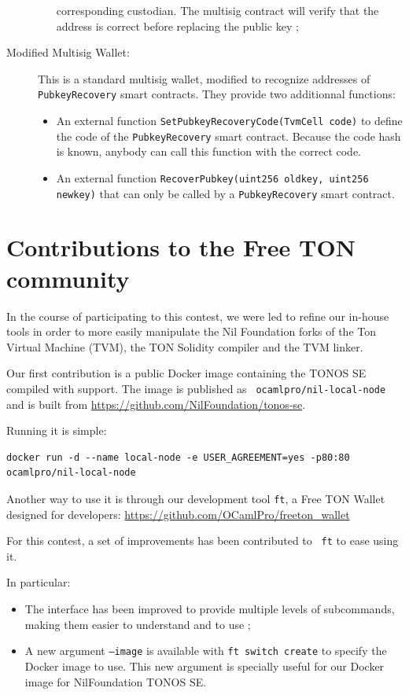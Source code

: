 \documentclass[10pt,a4paper]{article}
\begin{document}
\begin{description}
\begin{itemize}
    corresponding custodian. The multisig contract will verify that
    the address is correct before replacing the public key ;
  \end{itemize}
\item[Modified Multisig Wallet:] This is a standard multisig wallet,
  modified to recognize addresses of \lstinline{PubkeyRecovery} smart
  contracts. They provide two additionnal functions:
  \begin{itemize}
  \item An external function
    \lstinline{SetPubkeyRecoveryCode(TvmCell code)}
    to define the code of the \lstinline{PubkeyRecovery} smart
    contract. Because the code hash is known, anybody can call this
    function with the correct code.
  \item An external function
    \lstinline{RecoverPubkey(uint256 oldkey, uint256 newkey)}
    that can only be called by a
    \lstinline{PubkeyRecovery} smart contract.
  \end{itemize}
\end{description}


\section{Contributions to the Free TON community}
\label{sec:contributions}

In the course of participating to this contest, we were led to refine
our in-house tools in order to more easily manipulate the Nil
Foundation forks of the Ton Virtual Machine (TVM), the TON Solidity
compiler and the TVM linker.

Our first contribution is a public Docker image containing the TONOS
SE compiled with \zksnarks{} support. The image is published as {\tt
  ocamlpro/nil-local-node} and is built from
\url{https://github.com/NilFoundation/tonos-se}.

Running it is simple:
\begin{verbatim}
docker run -d --name local-node -e USER_AGREEMENT=yes -p80:80 ocamlpro/nil-local-node
\end{verbatim}

Another way to use it is through our development tool {\tt ft}, a Free
TON Wallet designed for developers:
\url{https://github.com/OCamlPro/freeton_wallet}

For this contest, a set of improvements has been contributed to {\tt
  ft} to ease using it.

In particular:
\begin{itemize}
\item The interface has been improved to provide multiple levels of
  subcommands, making them easier to understand and to use ;
\item A new argument {\tt --image} is available with {\tt ft switch
  create} to specify the Docker image to use. This new argument is
  specially useful for our Docker image for NilFoundation TONOS SE.
\end{itemize}
\end{document}
